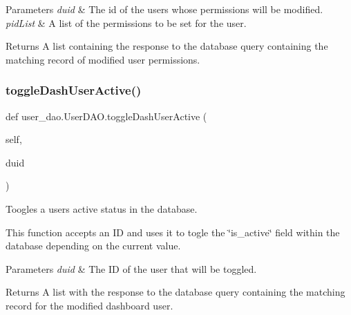 \begin{DoxyParams}{Parameters}
{\em duid} & The id of the user\textquotesingle{}s whose permissions will be modified. \\
\hline
{\em pid\+List} & A list of the permissions to be set for the user.\\
\hline
\end{DoxyParams}
\begin{DoxyReturn}{Returns}
A list containing the response to the database query containing the matching record of modified user permissions. 
\end{DoxyReturn}
\mbox{\label{classuser__dao_1_1_user_d_a_o_a7a046b936497fa50d228a04c2cb0e5d6}} 
\subsubsection{\texorpdfstring{toggle\+Dash\+User\+Active()}{toggleDashUserActive()}}
{\footnotesize\ttfamily def user\+\_\+dao.\+User\+D\+A\+O.\+toggle\+Dash\+User\+Active (\begin{DoxyParamCaption}\item[{}]{self,  }\item[{}]{duid }\end{DoxyParamCaption})}



Toogles a user\textquotesingle{}s active status in the database. 

This function accepts an ID and uses it to togle the \char`\"{}is\+\_\+active\char`\"{} field within the database depending on the current value.


\begin{DoxyParams}{Parameters}
{\em duid} & The ID of the user that will be toggled.\\
\hline
\end{DoxyParams}
\begin{DoxyReturn}{Returns}
A list with the response to the database query containing the matching record for the modified dashboard user. 
\end{DoxyReturn}
\mbox{\label{classuser__dao_1_1_user_d_a_o_a38e0a49d3aa13111b1d54a6c9aaa0286}} 
